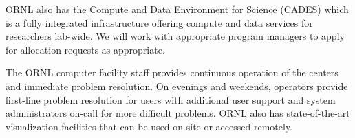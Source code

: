 ORNL also has the Compute and Data Environment for Science (CADES) which is a 
fully integrated infrastructure offering compute and data services for 
researchers lab-wide. We will work with appropriate program managers to apply 
for allocation requests as appropriate.


 The ORNL computer facility staff 
provides continuous operation of the centers 
and immediate problem resolution. On evenings and weekends, operators provide 
first-line problem resolution for users with 
additional user support and system administrators on-call for more difficult 
problems. ORNL also has state-of-the-art 
visualization facilities that can be used on site or accessed remotely. 
